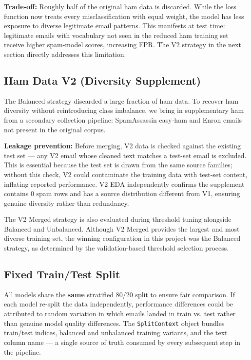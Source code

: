 \textbf{Trade-off:} Roughly half of the original ham data is discarded. While the loss function now treats every misclassification with equal weight, the model has less exposure to diverse legitimate email patterns. This manifests at test time: legitimate emails with vocabulary not seen in the reduced ham training set receive higher spam-model scores, increasing FPR. The V2 strategy in the next section directly addresses this limitation.

\subsection{Ham Data V2 (Diversity Supplement)}

The Balanced strategy discarded a large fraction of ham data. To recover ham diversity without reintroducing class imbalance, we bring in supplementary ham from a secondary collection pipeline: SpamAssassin easy-ham and Enron emails not present in the original corpus.

\textbf{Leakage prevention:} Before merging, V2 data is checked against the existing test set — any V2 email whose cleaned text matches a test-set email is excluded. This is essential because the test set is drawn from the same source families; without this check, V2 could contaminate the training data with test-set content, inflating reported performance. V2 EDA independently confirms the supplement contains 0 spam rows and has a source distribution different from V1, ensuring genuine diversity rather than redundancy.

The V2 Merged strategy is also evaluated during threshold tuning alongside Balanced and Unbalanced. Although V2 Merged provides the largest and most diverse training set, the winning configuration in this project was the Balanced strategy, as determined by the validation-based threshold selection process.

\subsection{Fixed Train/Test Split}

All models share the \textbf{same} stratified 80/20 split to ensure fair comparison. If each model re-split the data independently, performance differences could be attributed to random variation in which emails landed in train vs. test rather than genuine model quality differences. The \texttt{SplitContext} object bundles train/test indices, balanced and unbalanced training variants, and the text column name — a single source of truth consumed by every subsequent step in the pipeline.

